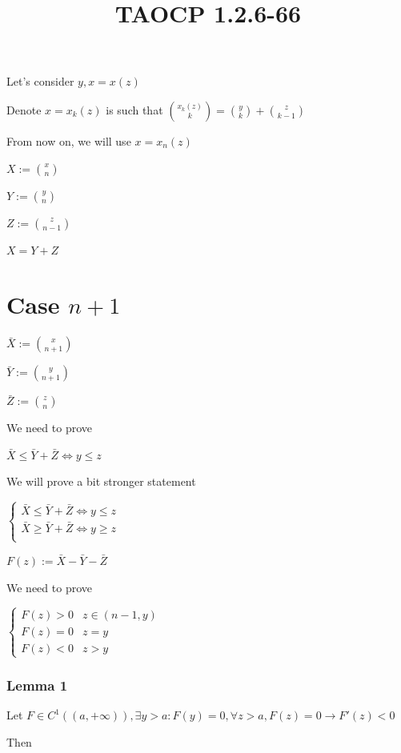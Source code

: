 \documentclass{article}
\title{TAOCP 1.2.6\mbox{-}66}
\begin{document}
\maketitle

Let's consider \( y, x = x(z) \)

Denote \( x = x_{k}(z) \) is such that \( \binom{x_{k}(z)}{k} = \binom{y}{k} + \binom{z}{k-1} \)

From now on, we will use \( x = x_{n}(z) \)

\( X := \binom{x}{n} \)

\( Y := \binom{y}{n} \)

\( Z := \binom{z}{n-1} \)

\( X = Y + Z \)

\section*{Case \( n + 1 \)}

\( \bar{X} := \binom{x}{n+1} \)

\( \bar{Y} := \binom{y}{n+1} \)

\( \bar{Z} := \binom{z}{n} \)

We need to prove

\( \bar{X} \leq \bar{Y} + \bar{Z} \iff y \leq z \)

We will prove a bit stronger statement

\( \left\{\begin{array}{l}\bar{X} \leq \bar{Y} + \bar{Z} \iff y \leq z\\\bar{X} \geq \bar{Y} + \bar{Z} \iff y \geq z\\\end{array}\right. \)

\( F(z) := \bar{X} - \bar{Y} - \bar{Z} \)

We need to prove

\( \begin{cases}F(z)>0 & z\in(n-1,y)\\ F(z)=0 & z=y\\ F(z)<0 & z>y\end{cases} \)

\subsubsection*{Lemma 1}

Let \( F \in C^{1}((a, +\infty)), \exists y > a: F(y) = 0, \forall z > a, F(z) = 0 \rightarrow F'(z) < 0 \)

Then
\end{document}
